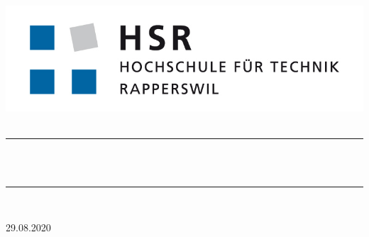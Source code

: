 
\begin{titlepage}


\vspace*{\fill}

\newcommand{\HRule}{\color{sectioncolor}\rule{\linewidth}{0.5mm}} %

\center

\includegraphics[scale=.4,keepaspectratio]{Graphic/HSR_Logo_RGB_72}\\[1cm] 


\textsc{\huge \SUBJECT}\\[1cm]

{\HRule} \\[0.7cm]
{ \Huge \bfseries \textcolor{sectioncolor}{\TITLE}}\\[0.4cm]
{\HRule} \\[1.1cm]

\Large \AUTHOR

\Large 29.08.2020


\vfill %

\end{titlepage} 



